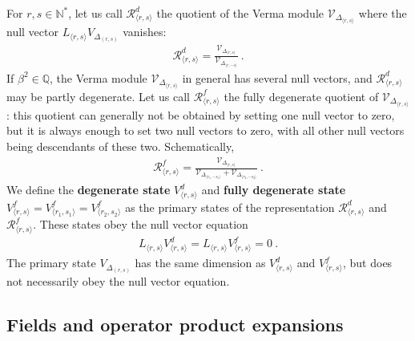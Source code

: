 \documentclass[12pt, a4paper]{article}
\newcommand{\myindex}[1]{\textbf{\boldmath #1}}
\theoremstyle{break}
\begin{document}
For $r,s\in\mathbb{N}^*$, let us call $\mathcal{R}^d_{\langle r,s\rangle}$ the quotient of the Verma module $\mathcal{V}_{\Delta_{\langle r,s\rangle}}$ where the null vector $L_{\langle r,s\rangle}V_{\Delta_{(r,s)}}$ vanishes:
\begin{align}
 \mathcal{R}^d_{\langle r,s\rangle} 
 =\frac{\mathcal{V}_{\Delta_{\langle r,s\rangle}}}{\mathcal{V}_{\Delta_{\langle r,-s\rangle}}}\ . 
 \label{rvv}
\end{align}
If $\beta^2\in \mathbb{Q}$, the Verma module $\mathcal{V}_{\Delta_{\langle r,s\rangle}}$ in general has several null vectors, and $\mathcal{R}^d_{\langle r,s\rangle}$ may be partly degenerate. Let us call $\mathcal{R}^f_{\langle r,s\rangle}$ the fully degenerate quotient of  $\mathcal{V}_{\Delta_{\langle r,s\rangle}}$: this quotient can generally not be obtained by setting one null vector to zero, but it is always enough to set two null vectors to zero, with all other null vectors being descendants of these two. Schematically,
\begin{align}
 \mathcal{R}^f_{\langle r,s\rangle} = \frac{\mathcal{V}_{\Delta_{\langle r,s\rangle}}}{\mathcal{V}_{\Delta_{\langle r_1,-s_1\rangle}}+ \mathcal{V}_{\Delta_{\langle r_2,-s_2\rangle}}}\ .
\end{align}
We define the \myindex{degenerate state} $V^d_{\langle r,s\rangle}$ and \myindex{fully degenerate state} $V^f_{\langle r,s\rangle}=V^f_{\langle r_1,s_1\rangle}=V^f_{\langle r_2,s_2\rangle}$ as the primary states of the representation $\mathcal{R}^d_{\langle r,s\rangle}$ and 
$\mathcal{R}^f_{\langle r,s\rangle}$. These states obey the null vector equation
\begin{align}
L_{\langle r, s\rangle} V^d_{\langle r,s\rangle} = L_{\langle r, s\rangle} V^f_{\langle r,s\rangle} = 0\ .
\label{lvdz}
\end{align}
The primary state $V_{\Delta_{(r,s)}}$ has the same dimension as $V^d_{\langle r,s\rangle}$ and $V^f_{\langle r,s\rangle}$, but does not necessarily obey the null vector equation. 

\subsection{Fields and operator product expansions}\label{sec:fope}
\end{document}
